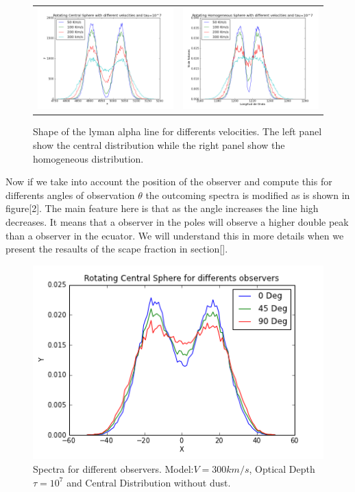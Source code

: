 \documentclass{article}
\theoremstyle{definition}
\theoremstyle{remark}
\begin{document}
\begin{figure}[H]

  \centering

  \label{HOMandCentral}\caption{Shape of the lyman alpha line for
    differents velocities. The left panel show the central
    distribution while the right panel show the homogeneous
    distribution. } 

  \begin{tabular}{cc}    
    \includegraphics[width=60mm]{7tDifSpeedsZ.png}&
    \includegraphics[width=60mm]{7tHOMDifSpeeds1.png}\\
  \end{tabular}

\end{figure}
Now if we take into account the position of the observer and compute
this for differents angles of observation $\theta$ the outcoming
spectra is modified as is shown in figure[2]. The main feature here is
that as the angle increases the line high decreases. It means that a
observer in the poles will observe a higher double peak than a
observer in the ecuator. We will understand this in more details when
we present the resaults of the scape fraction in section[].      

\begin{figure}[H]
\begin{center}
\includegraphics[scale=0.45]{Observers.png}
\end{center}
\caption{Spectra for different observers. Model:$V=300km/s$, Optical
  Depth $\tau=10^{7}$ and Central Distribution without dust.} 
\end{figure}
\end{document}
